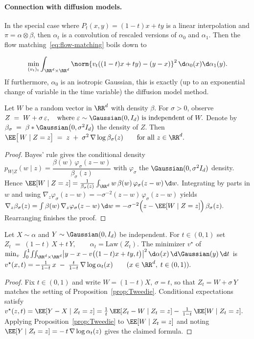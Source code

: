 \paragraph{Connection with diffusion models.}
In the special case where $P_t(x,y)=(1-t)x+ty$ is a linear interpolation and $\pi = \alpha \otimes \beta$, then $\alpha_t$ is a convolution of rescaled versions of $\alpha_0$ and $\alpha_1$. Then the flow matching~\eqref{eq:flow-matching} boils down to

$$
\min_{(v_t)_t} \int_{\RR^{d} \times \RR^d} \norm{v_t( (1-t)x+t y ) - (y-x) }^2 \, \d\alpha_0(x) \d\alpha_1(y).
$$
If furthermore, $\alpha_0$ is an isotropic Gaussian, this is exactly (up to an exponential change of variable in the time variable) the diffusion model method.

\begin{proposition}\label{prop:Tweedie}
Let $W$ be a random vector in $\RR^{d}$ with density $\beta$.
For $\sigma>0$, observe
\(Z \;=\; W + \sigma\,\varepsilon, \quad\text{where } \varepsilon \sim \Gaussian(0,I_{d}) \text{ is independent of } W.\)
Denote by \(\beta_\sigma \;=\; \beta * \Gaussian\bigl(0,\sigma^{2}I_{d}\bigr)\)
the density of $Z$.
Then
\(\EE\bigl[\,W \mid Z=z\bigr] \;=\; z \;+\;\sigma^{2}\,\nabla \log \beta_\sigma(z) \qquad\text{for all } z \in \RR^{d}.\)
\end{proposition}
\begin{proof}
Bayes' rule gives the conditional density
$
p_{W|Z}(w\mid z)
= \dfrac{\beta(w)\,\varphi_\sigma(z-w)}{\beta_\sigma(z)}
$
with $\varphi_\sigma$ the $\Gaussian(0,\sigma^{2}I_{d})$ density.
Hence
\(\EE[W\mid Z=z] = \frac{1}{\beta_\sigma(z)} \int_{\RR^{d}} w\, \beta(w)\,\varphi_\sigma(z-w)\,\d w.\)
Integrating by parts in $w$ and using
$
\nabla_z\varphi_\sigma(z-w)
= -\sigma^{-2}(z-w)\,\varphi_\sigma(z-w)
$
yields
\(\nabla_z\beta_\sigma(z) = \int \beta(w)\,\nabla_z\varphi_\sigma(z-w)\,\d w = -\sigma^{-2}\Bigl(z-\EE[W\mid Z=z]\Bigr)\,\beta_\sigma(z).\)
Rearranging finishes the proof.
\end{proof}
\begin{proposition}\label{prop:flow}
Let $X\sim\alpha$ and $Y\sim\Gaussian(0,I_{d})$ be independent.
For $t\in(0,1)$ set
\(Z_t \;=\; (1-t)\,X + t\,Y, \qquad \alpha_t =\text{Law}(Z_t).\)
The minimizer $v^\star$ of
\(\min_{v}\;\int_{0}^{1}\! \iint_{\RR^{d}\times\RR^{d}} \bigl|y-x-v\bigl((1-t)x+t y,t\bigr)\bigr|^{2}\, \d\alpha(x)\,\d\Gaussian(y)\,\d t\)
is \(v^\star(x,t) = -\frac{1}{1-t}\,x \;-\; \frac{t}{1-t}\,\nabla\log\alpha_t(x) \qquad (x\in\RR^{d},\;t\in(0,1)).\)
\end{proposition}
\begin{proof}
Fix $t\in(0,1)$ and write $W=(1-t)X$, $\sigma=t$, so that
$Z_t = W + \sigma\,Y$ matches the setting of Proposition~\ref{prop:Tweedie}.
Conditional expectations satisfy
$
v^\star(z,t)
= \EE[Y-X\mid Z_t=z]
= \frac{1}{t}\,\EE[Z_t-W\mid Z_t=z]
-\,\frac{1}{1-t}\,\EE[W\mid Z_t=z].
$
Applying Proposition~\ref{prop:Tweedie} to $\EE[W\mid Z_t=z]$ and
noting $\EE[Y\mid Z_t=z]
= -\,t\,\nabla\log\alpha_t(z)$
gives the claimed formula.
\end{proof}
